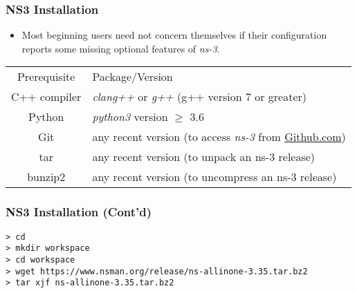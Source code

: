\documentclass{../iot-lecture}
\begin{document}
\begin{frame}
  \frametitle{NS3 Installation}
  \begin{itemize}
    \item Most beginning users need not concern themselves if their configuration reports some missing
      optional features of \textit{ns-3}.
  \end{itemize}
  \begin{table}
    \begin{tabular}{cp{}}
      Prerequisite &
      Package/Version \\

      C++ compiler &
      \textit{clang++} or \textit{g++} (g++ version 7 or greater) \\

      Python &
      \textit{python3} version $\geq$ 3.6 \\

      Git &
      any recent version (to access \textit{ns-3} from \href{https://github.com/nsnam/ns-3-dev-git}{Github.com}) \\

      tar &
      any recent version (to unpack an ns-3 release) \\

      bunzip2 &
      any recent version (to uncompress an ns-3 release) \\
    \end{tabular}
  \end{table}
\end{frame}

\begin{frame}[fragile]
  \frametitle{NS3 Installation (Cont'd)}
  \begin{verbatim}
> cd
> mkdir workspace
> cd workspace
> wget https://www.nsman.org/release/ns-allinone-3.35.tar.bz2
> tar xjf ns-allinone-3.35.tar.bz2
  \end{verbatim}
\end{frame}
\end{document}
